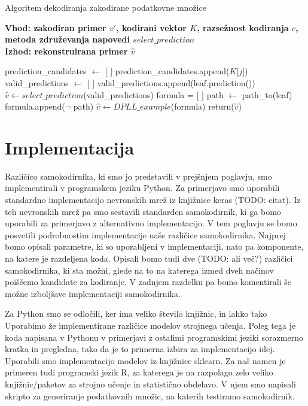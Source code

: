\documentclass[12pt,a4paper]{article}
\begin{document}
\begin{algorithm}[h!]
	\caption{Algoritem dekodiranja zakodirane podatkovne množice}
	\label{algoritem-decode}
	\raggedright
	\textbf{Vhod: zakodiran primer $v'$, kodirani vektor $K$, razsežnost kodiranja $c$, metoda združevanja napovedi $select\_prediction$}  \\
	\textbf{Izhod: rekonstruirana primer $\hat{v}$} 
	\begin{algorithmic}[1]
			\State prediction\_candidates $\gets$ [ ]
				\State prediction\_candidates.append($K$[$j$])
			\EndIf
		\EndFor
			\State valid\_predictions $\gets$ [ ]
				\State valid\_predictions.append(leaf.prediction())
			\EndFor
			\State $\hat{v} \gets select\_prediction$(valid\_predictions) 
		\Else
			\State formula = [ ]
				\State path $\gets$ path\_to(leaf)
				\State formula.append($\lnot$ path)
			\EndFor
			\State $\hat{v} \gets DPLL\_example$(formula)
		\EndIf
		\State return($\hat{v}$)
	\end{algorithmic}
\end{algorithm}



\section{Implementacija}

Različico samokodirnika, ki smo jo predstavili v prejšnjem poglavju, smo implementirali v programskem jeziku Python.
Za primerjavo smo uporabili standardno implementacijo nevronskih mrež iz knjižnice keras (TODO: citat).
Iz teh nevronskih mrež pa smo sestavili standarden samokodirnik, ki ga bomo uporabili za primerjavo z alternativno implementacijo.
V tem poglavju se bomo posvetili podrobnostim implementacije naše različice samokodirnika.
Najprej bomo opisali parametre, ki so uporabljeni v implementaciji, nato pa komponente, na katere je razdeljena koda.
Opisali bomo tudi dve (TODO: ali več?) različici samokodirnika, ki sta možni, glede na to na katerega izmed dveh načinov poiščemo kandidate za kodiranje.
V zadnjem razdelku pa bomo komentirali še možne izboljšave implementaciji samokodirnika.

Za Python smo se odločili, ker ima veliko število knjižnic, in lahko tako Uporabimo že implementirane različice modelov strojnega učenja.
Poleg tega je koda napisana v Pythonu v primerjavi z ostalimi programskimi jeziki sorazmerno kratka in pregledna, tako da je to primerna izbira za implementacijo idej.
Uporabili smo implementacijo modelov iz knjižnice sklearn.
Za naš namen je primeren tudi programski jezik R, za katerega je na razpolago zelo veliko knjižnic/paketov za strojno učenje in statistično obdelavo.
V njem smo napisali skripto za generiranje podatkovnih množic, na katerih testiramo samokodirnik.
\end{document}
